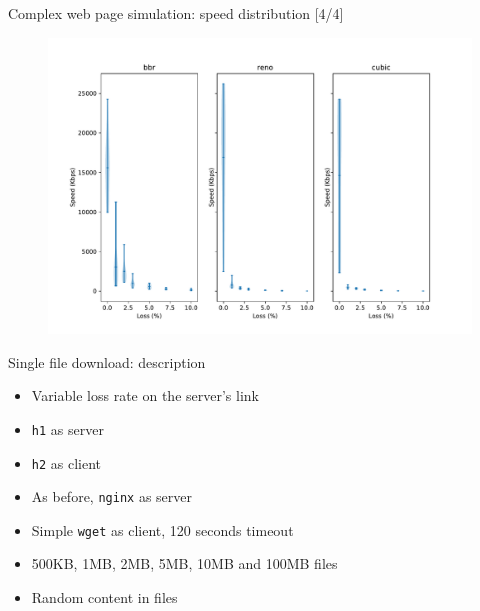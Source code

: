 \documentclass[13pt,aspectratio=43]{beamer}
\begin{document}
\begin{frame}{Complex web page simulation: speed distribution [4/4]}
  \begin{figure}
	  \includegraphics[width=\textwidth,height=\textheight,keepaspectratio]{../http_test/violinplot.pdf}
  \end{figure}
\end{frame}




\begin{frame}{Single file download: description}
		\begin{itemize}
			\item Variable loss rate on the server's link
			\item \texttt{h1} as server
			\item \texttt{h2} as client
			\item As before, \texttt{nginx} as server
			\item Simple \texttt{wget} as client, 120 seconds timeout
			\item 500KB, 1MB, 2MB, 5MB, 10MB and 100MB files
			\item Random content in files
		\end{itemize}
\end{frame}
\end{document}
